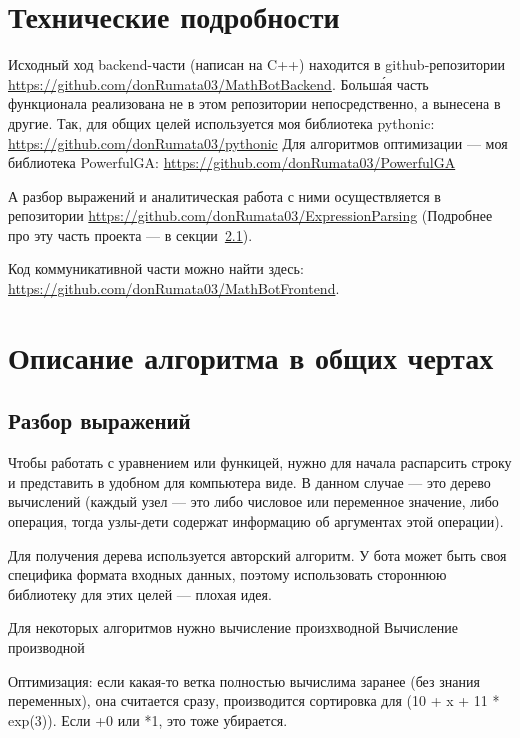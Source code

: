 \documentclass[11pt]{article}
\begin{document}
    \section{Технические подробности}

    Исходный ход backend-части (написан на C++) находится в github-репозитории \url{https://github.com/donRumata03/MathBotBackend}.
    Больша́я часть функционала реализована не в этом репозитории непосредственно, а вынесена в другие.
    Так, для общих целей используется моя библиотека pythonic: \url{https://github.com/donRumata03/pythonic}
    Для алгоритмов оптимизации — моя библиотека PowerfulGA: \url{https://github.com/donRumata03/PowerfulGA}

    А разбор выражений и аналитическая работа с ними осуществляется в репозитории \url{https://github.com/donRumata03/ExpressionParsing}
    (Подробнее про эту часть проекта — в секции~\ref{subsec:expression-parsing}).

    Код коммуникативной части можно найти здесь: \url{https://github.com/donRumata03/MathBotFrontend}.

    \section{Описание алгоритма в общих чертах}

    \subsection{Разбор выражений}\label{subsec:expression-parsing}
    Чтобы работать с уравнением или функицей, нужно для начала распарсить строку и представить в удобном для компьютера виде.
    В данном случае — это дерево вычислений (каждый узел — это либо числовое или переменное значение, либо операция, тогда узлы-дети содержат информацию об аргументах этой операции).

    Для получения дерева используется авторский алгоритм.
    У бота может быть своя специфика формата входных данных, поэтому использовать стороннюю библиотеку для этих целей — плохая идея.

    Для некоторых алгоритмов нужно вычисление произхводной Вычисление производной

    Оптимизация: если какая-то ветка полностью вычислима заранее (без знания переменных), она считается сразу, производится сортировка для (10 + x + 11 * exp(3)).
    Если +0 или *1, это тоже убирается.
\end{document}
